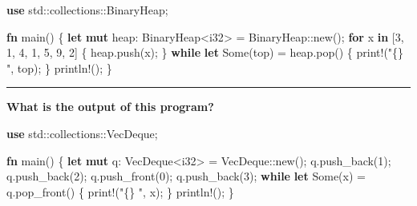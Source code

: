 \documentclass[
  11pt,
]{article}
\newenvironment{Shaded}{}{}
\newcommand{\ConstantTok}[1]{\textcolor[rgb]{0.53,0.00,0.00}{#1}}
\newcommand{\ControlFlowTok}[1]{\textcolor[rgb]{0.00,0.44,0.13}{\textbf{#1}}}
\newcommand{\DataTypeTok}[1]{\textcolor[rgb]{0.56,0.13,0.00}{#1}}
\newcommand{\DecValTok}[1]{\textcolor[rgb]{0.25,0.63,0.44}{#1}}
\newcommand{\KeywordTok}[1]{\textcolor[rgb]{0.00,0.44,0.13}{\textbf{#1}}}
\newcommand{\NormalTok}[1]{#1}
\newcommand{\OperatorTok}[1]{\textcolor[rgb]{0.40,0.40,0.40}{#1}}
\newcommand{\PreprocessorTok}[1]{\textcolor[rgb]{0.74,0.48,0.00}{#1}}
\newcommand{\StringTok}[1]{\textcolor[rgb]{0.25,0.44,0.63}{#1}}
\begin{document}
\begin{Shaded}
\begin{Highlighting}[]
\KeywordTok{use} \PreprocessorTok{std::collections::}\NormalTok{BinaryHeap}\OperatorTok{;}

\KeywordTok{fn}\NormalTok{ main() }\OperatorTok{\{}
    \KeywordTok{let} \KeywordTok{mut}\NormalTok{ heap}\OperatorTok{:}\NormalTok{ BinaryHeap}\OperatorTok{\textless{}}\DataTypeTok{i32}\OperatorTok{\textgreater{}} \OperatorTok{=} \PreprocessorTok{BinaryHeap::}\NormalTok{new()}\OperatorTok{;}
    \ControlFlowTok{for}\NormalTok{ x }\KeywordTok{in}\NormalTok{ [}\DecValTok{3}\OperatorTok{,} \DecValTok{1}\OperatorTok{,} \DecValTok{4}\OperatorTok{,} \DecValTok{1}\OperatorTok{,} \DecValTok{5}\OperatorTok{,} \DecValTok{9}\OperatorTok{,} \DecValTok{2}\NormalTok{] }\OperatorTok{\{}
\NormalTok{        heap}\OperatorTok{.}\NormalTok{push(x)}\OperatorTok{;}
    \OperatorTok{\}}
    \ControlFlowTok{while} \KeywordTok{let} \ConstantTok{Some}\NormalTok{(top) }\OperatorTok{=}\NormalTok{ heap}\OperatorTok{.}\NormalTok{pop() }\OperatorTok{\{}
        \PreprocessorTok{print!}\NormalTok{(}\StringTok{"\{\} "}\OperatorTok{,}\NormalTok{ top)}\OperatorTok{;}
    \OperatorTok{\}}
    \PreprocessorTok{println!}\NormalTok{()}\OperatorTok{;}
\OperatorTok{\}}
\end{Highlighting}
\end{Shaded}

\begin{center}\rule{0.5\linewidth}{0.5pt}\end{center}

\textbf{What is the output of this program?}

\begin{Shaded}
\begin{Highlighting}[]
\KeywordTok{use} \PreprocessorTok{std::collections::}\NormalTok{VecDeque}\OperatorTok{;}

\KeywordTok{fn}\NormalTok{ main() }\OperatorTok{\{}
    \KeywordTok{let} \KeywordTok{mut}\NormalTok{ q}\OperatorTok{:}\NormalTok{ VecDeque}\OperatorTok{\textless{}}\DataTypeTok{i32}\OperatorTok{\textgreater{}} \OperatorTok{=} \PreprocessorTok{VecDeque::}\NormalTok{new()}\OperatorTok{;}
\NormalTok{    q}\OperatorTok{.}\NormalTok{push\_back(}\DecValTok{1}\NormalTok{)}\OperatorTok{;}
\NormalTok{    q}\OperatorTok{.}\NormalTok{push\_back(}\DecValTok{2}\NormalTok{)}\OperatorTok{;}
\NormalTok{    q}\OperatorTok{.}\NormalTok{push\_front(}\DecValTok{0}\NormalTok{)}\OperatorTok{;}
\NormalTok{    q}\OperatorTok{.}\NormalTok{push\_back(}\DecValTok{3}\NormalTok{)}\OperatorTok{;}
    \ControlFlowTok{while} \KeywordTok{let} \ConstantTok{Some}\NormalTok{(x) }\OperatorTok{=}\NormalTok{ q}\OperatorTok{.}\NormalTok{pop\_front() }\OperatorTok{\{}
        \PreprocessorTok{print!}\NormalTok{(}\StringTok{"\{\} "}\OperatorTok{,}\NormalTok{ x)}\OperatorTok{;}
    \OperatorTok{\}}
    \PreprocessorTok{println!}\NormalTok{()}\OperatorTok{;}
\OperatorTok{\}}
\end{Highlighting}
\end{Shaded}
\end{document}
